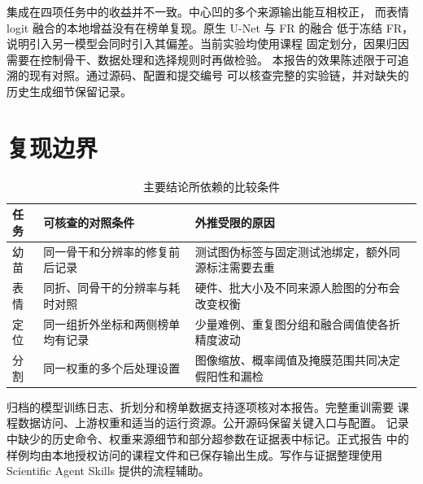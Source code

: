 集成在四项任务中的收益并不一致。中心凹的多个来源输出能互相校正，
而表情 logit 融合的本地增益没有在榜单复现。原生 U-Net 与 FR 的融合
低于冻结 FR，说明引入另一模型会同时引入其偏差。当前实验均使用课程
固定划分，因果归因需要在控制骨干、数据处理和选择规则时再做检验。
本报告的效果陈述限于可追溯的现有对照。通过源码、配置和提交编号
可以核查完整的实验链，并对缺失的历史生成细节保留记录。

\section{复现边界}
\begin{table}[H]
\centering\small
\caption{主要结论所依赖的比较条件}
\begin{tabularx}{\linewidth}{@{}P{23mm}YY@{}}
\toprule
任务 & 可核查的对照条件 & 外推受限的原因 \\
\midrule
幼苗 & 同一骨干和分辨率的修复前后记录 & 测试图伪标签与固定测试池绑定，额外同源标注需要去重 \\
表情 & 同折、同骨干的分辨率与耗时对照 & 硬件、批大小及不同来源人脸图的分布会改变权衡 \\
定位 & 同一组折外坐标和两侧榜单均有记录 & 少量难例、重复图分组和融合阈值使各折精度波动 \\
分割 & 同一权重的多个后处理设置 & 图像缩放、概率阈值及掩膜范围共同决定假阳性和漏检 \\
\bottomrule
\end{tabularx}
\end{table}

归档的模型训练日志、折划分和榜单数据支持逐项核对本报告。完整重训需要
课程数据访问、上游权重和适当的运行资源。公开源码保留关键入口与配置。
记录中缺少的历史命令、权重来源细节和部分超参数在证据表中标记。正式报告
中的样例均由本地授权访问的课程文件和已保存输出生成。写作与证据整理使用
Scientific Agent Skills 提供的流程辅助\citep{kassis2026skills}。
